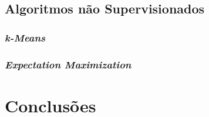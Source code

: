 \documentclass{article}
\begin{document}
\subsection{Algoritmos não Supervisionados}

\subsubsection{{\b \it k-Means}}

\subsubsection{{\b \it Expectation Maximization}}

\section{Conclusões}


\end{document}

